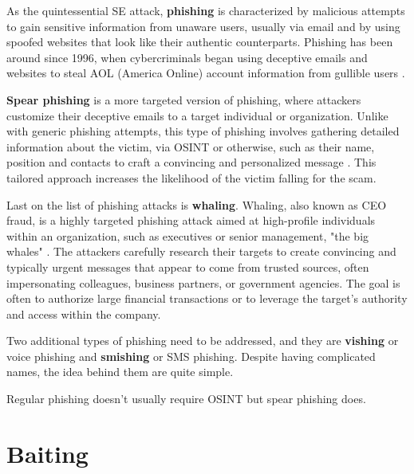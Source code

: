 As the quintessential SE attack, \textbf{phishing} is characterized by malicious attempts to gain sensitive information from unaware users, usually via email and by using spoofed websites that look like their authentic counterparts. Phishing has been around since 1996, when cybercriminals began using deceptive emails and websites to steal AOL (America Online) account information from gullible users \citep{wang_defining_2020}.

\textbf{Spear phishing} is a more targeted version of phishing, where attackers customize their deceptive emails to a target individual or organization. Unlike with generic phishing attempts, this type of phishing involves gathering detailed information about the victim, via OSINT or otherwise, such as their name, position and contacts to craft a convincing and personalized message \citep{salahdine_social_2019}. This tailored approach increases the likelihood of the victim falling for the scam.

Last on the list of phishing attacks is \textbf{whaling}. Whaling, also known as CEO fraud, is a highly targeted phishing attack aimed at high-profile individuals within an organization, such as executives or senior management, "the big whales" \citep{abraham_overview_2010}. The attackers carefully research their targets to create convincing and typically urgent messages that appear to come from trusted sources, often impersonating colleagues, business partners, or government agencies. The goal is often to authorize large financial transactions or to leverage the target's authority and access within the company.

Two additional types of phishing need to be addressed, and they are \textbf{vishing} or voice phishing and \textbf{smishing} or SMS phishing. Despite having complicated names, the idea behind them are quite simple.

Regular phishing doesn't usually require OSINT but spear phishing does.












\section{Baiting}

